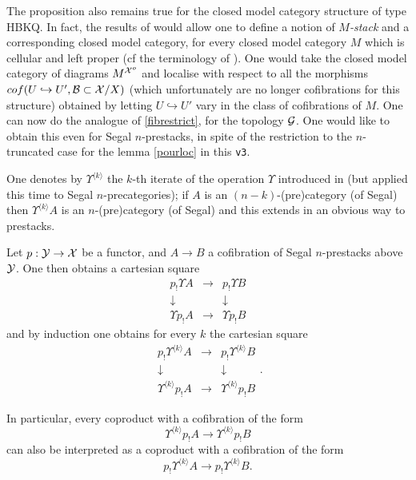 The proposition also remains true for the closed model category structure of
type HBKQ. In fact, the results of
\cite{Hirschhorn} would allow one to define a notion of \emph{$M$-stack}
and a
corresponding closed model category, for every closed model
category $M$ which is cellular and left proper (cf the terminology of
\cite{Hirschhorn}). One would take the closed model category of
diagrams $M^{{\cal X} ^o}$ and localise with respect to all the morphisms
$cof(U\hookrightarrow U', {\cal B} \subset {\cal X} /X)$ (which unfortunately are no
longer cofibrations for this structure) obtained by letting
$U\hookrightarrow U'$ vary in the class of
cofibrations of $M$.
One can now do the analogue of
\ref{fibrestrict}, for the
topology ${\cal G}$.
One would like to obtain this even for Segal $n$-prestacks,
in spite of the restriction to the $n$-truncated case for the lemma
\ref{pourloc} in this {\tt v3}.

One denotes by $\Upsilon ^{\langle k \rangle }$ the
$k$-th iterate of the operation $\Upsilon$ introduced in
\cite{limits} (but applied this time to Segal $n$-precategories);
if $A$ is an $(n-k)$-(pre)category
(of Segal) then $\Upsilon ^{\langle k\rangle } A$ is an $n$-(pre)category
(of Segal) and this extends in an obvious way to prestacks.

Let $p: {\cal Y} \rightarrow {\cal X}$ be a functor, and $A\rightarrow B$ a cofibration
of Segal $n$-prestacks above ${\cal Y}$. One then obtains a cartesian
square
$$
\begin{array}{ccc}
p_!\Upsilon A & \rightarrow & p_!\Upsilon B \\
\downarrow && \downarrow \\
\Upsilon p_!A & \rightarrow & \Upsilon p_!B
\end{array}
$$
and by induction one obtains for every $k$ the cartesian square
$$
\begin{array}{ccc}
p_!\Upsilon ^{\langle k \rangle }
A & \rightarrow & p_!\Upsilon ^{\langle k \rangle }B \\
\downarrow && \downarrow \\
\Upsilon ^{\langle k \rangle }p_!A & \rightarrow
& \Upsilon ^{\langle k \rangle } p_!B
\end{array} .
$$

In particular, every coproduct with a cofibration of the form
$$
\Upsilon ^{\langle k \rangle }p_!A  \rightarrow
\Upsilon ^{\langle k \rangle } p_!B
$$
can also be interpreted as a coproduct with a cofibration
of the form
$$
p_!\Upsilon ^{\langle k \rangle}
A \rightarrow  p_!\Upsilon ^{\langle k \rangle}B .
$$

